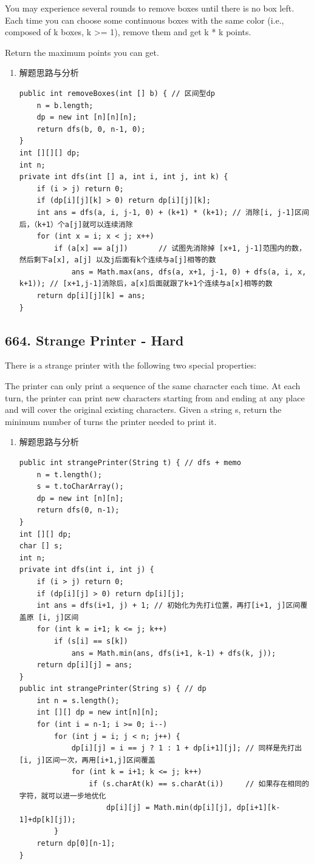 \documentclass[9pt, b5paaper]{book}
\begin{document}
You may experience several rounds to remove boxes until there is no box left. Each time you can choose some continuous boxes with the same color (i.e., composed of k boxes, k >= 1), remove them and get k * k points.

Return the maximum points you can get.
\begin{enumerate}
\item 解题思路与分析
\label{sec-1-3-5-1}
\begin{verbatim}
public int removeBoxes(int [] b) { // 区间型dp
    n = b.length;
    dp = new int [n][n][n];
    return dfs(b, 0, n-1, 0);
}
int [][][] dp;
int n;
private int dfs(int [] a, int i, int j, int k) {
    if (i > j) return 0;
    if (dp[i][j][k] > 0) return dp[i][j][k];
    int ans = dfs(a, i, j-1, 0) + (k+1) * (k+1); // 消除[i, j-1]区间后，（k+1）个a[j]就可以连续消除
    for (int x = i; x < j; x++) 
        if (a[x] == a[j])       // 试图先消除掉 [x+1, j-1]范围内的数，然后剩下a[x], a[j] 以及j后面有k个连续与a[j]相等的数
            ans = Math.max(ans, dfs(a, x+1, j-1, 0) + dfs(a, i, x, k+1)); // [x+1,j-1]消除后，a[x]后面就跟了k+1个连续与a[x]相等的数
    return dp[i][j][k] = ans;
}
\end{verbatim}
\end{enumerate}
\subsection{664. Strange Printer - Hard}
\label{sec-1-3-6}
There is a strange printer with the following two special properties:

The printer can only print a sequence of the same character each time.
At each turn, the printer can print new characters starting from and ending at any place and will cover the original existing characters.
Given a string s, return the minimum number of turns the printer needed to print it.
\begin{enumerate}
\item 解题思路与分析
\label{sec-1-3-6-1}
\begin{verbatim}
public int strangePrinter(String t) { // dfs + memo
    n = t.length();
    s = t.toCharArray();
    dp = new int [n][n];
    return dfs(0, n-1);
}
int [][] dp;
char [] s;
int n;
private int dfs(int i, int j) {
    if (i > j) return 0;
    if (dp[i][j] > 0) return dp[i][j];
    int ans = dfs(i+1, j) + 1; // 初始化为先打i位置，再打[i+1, j]区间覆盖原 [i, j]区间
    for (int k = i+1; k <= j; k++) 
        if (s[i] == s[k])
            ans = Math.min(ans, dfs(i+1, k-1) + dfs(k, j));
    return dp[i][j] = ans;
}
public int strangePrinter(String s) { // dp
    int n = s.length();
    int [][] dp = new int[n][n];
    for (int i = n-1; i >= 0; i--) 
        for (int j = i; j < n; j++) {
            dp[i][j] = i == j ? 1 : 1 + dp[i+1][j]; // 同样是先打出[i, j]区间一次，再用[i+1,j]区间覆盖
            for (int k = i+1; k <= j; k++) 
                if (s.charAt(k) == s.charAt(i))     // 如果存在相同的字符，就可以进一步地优化
                    dp[i][j] = Math.min(dp[i][j], dp[i+1][k-1]+dp[k][j]);
        }
    return dp[0][n-1];
}
\end{verbatim}
\end{enumerate}
\end{document}
